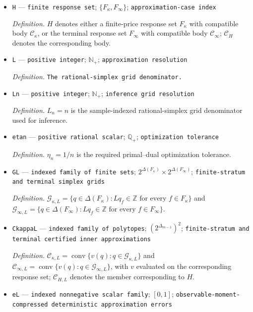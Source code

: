 \documentclass{article}
\begin{document}
\begin{itemize}
  \item \texttt{H} --- \texttt{finite response set}; \(\{F_\kappa,F_\infty\}\); \texttt{approximation-\allowbreak{}case index}
  \par\smallskip\noindent\emph{Definition.} \(H\) denotes either a finite-price response set \(F_\kappa\) with compatible body \(\mathcal C_\kappa\), or the terminal response set \(F_\infty\) with compatible body \(\mathcal C_\infty\); \(\mathcal C_H\) denotes the corresponding body.
  \item \texttt{L} --- \texttt{positive integer}; \(\mathbb N_+\); \texttt{approximation resolution}
  \par\smallskip\noindent\emph{Definition.} \texttt{The rational-\allowbreak{}simplex grid denominator.}
  \item \texttt{Ln} --- \texttt{positive integer}; \(\mathbb N_+\); \texttt{inference grid resolution}
  \par\smallskip\noindent\emph{Definition.} \(L_n=n\) is the sample-indexed rational-simplex grid denominator used for inference.
  \item \texttt{etan} --- \texttt{positive rational scalar}; \(\mathbb Q_{+}\); \texttt{optimization tolerance}
  \par\smallskip\noindent\emph{Definition.} \(\eta_n=1/n\) is the required primal--dual optimization tolerance.
  \item \texttt{GL} --- \texttt{indexed family of finite sets}; \(2^{\Delta(F_\kappa)}\times2^{\Delta(F_\infty)}\); \texttt{finite-\allowbreak{}stratum and terminal simplex grids}
  \par\smallskip\noindent\emph{Definition.} \(\mathcal G_{\kappa,L}=\{q\in\Delta(F_\kappa):Lq_f\in\mathbb Z\text{ for every }f\in F_\kappa\}\) and \(\mathcal G_{\infty,L}=\{q\in\Delta(F_\infty):Lq_f\in\mathbb Z\text{ for every }f\in F_\infty\}\).
  \item \texttt{CkappaL} --- \texttt{indexed family of polytopes}; \((2^{\Delta_{m-1}})^2\); \texttt{finite-\allowbreak{}stratum and terminal certified inner approximations}
  \par\smallskip\noindent\emph{Definition.} \(\mathcal C_{\kappa,L}=\operatorname{conv}\{v(q):q\in\mathcal G_{\kappa,L}\}\) and \(\mathcal C_{\infty,L}=\operatorname{conv}\{v(q):q\in\mathcal G_{\infty,L}\}\), with \(v\) evaluated on the corresponding response set; \(\mathcal C_{H,L}\) denotes the member corresponding to \(H\).
  \item \texttt{eL} --- \texttt{indexed nonnegative scalar family}; \([0,1]\); \texttt{observable-\allowbreak{}moment-\allowbreak{}compressed deterministic approximation errors}

\end{itemize}
\end{document}
